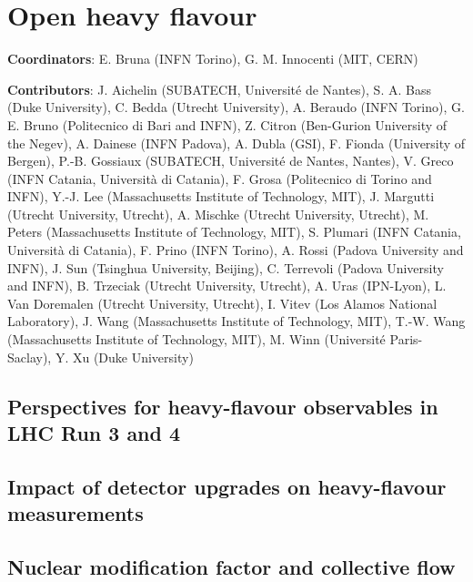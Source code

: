 \documentclass[../report.tex]{subfiles}
\providecommand{\main}{..}
\begin{document}
\clearpage
\section{Open heavy flavour}
\label{sec:HI_HF}

{ \small
\noindent 
\textbf{Coordinators}: E. Bruna (INFN Torino), G. M. Innocenti (MIT, CERN)

\noindent \textbf{Contributors}: 
J. Aichelin (SUBATECH, Universit\'e de Nantes),
S. A. Bass (Duke University),
C. Bedda (Utrecht University),
A. Beraudo (INFN Torino),
G. E. Bruno (Politecnico di Bari and INFN), 
Z. Citron (Ben-Gurion University of the Negev),
A. Dainese (INFN Padova),
A. Dubla (GSI),
F. Fionda (University of Bergen),
P.-B. Gossiaux (SUBATECH, Universit\'e de Nantes, Nantes),
V. Greco (INFN Catania, Universit\`a di Catania),
F. Grosa (Politecnico di Torino and INFN),
Y.-J. Lee (Massachusetts Institute of Technology, MIT),
J. Margutti (Utrecht University, Utrecht),
A. Mischke (Utrecht University, Utrecht),
M. Peters (Massachusetts Institute of Technology, MIT),
S. Plumari (INFN Catania, Universit\`a di Catania),
F. Prino (INFN Torino),
A. Rossi (Padova University and INFN),
J. Sun (Tsinghua University, Beijing),
C. Terrevoli (Padova University and INFN),
B. Trzeciak (Utrecht University, Utrecht),
A. Uras (IPN-Lyon),
L. Van Doremalen (Utrecht University, Utrecht),
I. Vitev (Los Alamos National Laboratory),
J. Wang (Massachusetts Institute of Technology, MIT),
T.-W. Wang (Massachusetts Institute of Technology, MIT),
M. Winn (Universit\'e Paris-Saclay),
Y. Xu (Duke University)
}



\subsection{Perspectives for heavy-flavour observables in LHC Run 3 and 4}


\subsection{Impact of detector upgrades on heavy-flavour measurements}


\subsection{Nuclear modification factor and collective flow}

\end{document}
